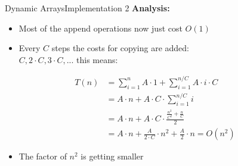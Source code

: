 \begin{frame}{Dynamic Arrays}{Implementation 2}
  \textbf{Analysis:}
  \begin{itemize}
    \item
     Most of the append operations now just cost $O(1)$
    \item
      Every $C$ steps the costs for copying are added:\\
      $C, 2 \cdot C,3 \cdot C, ...$ this means:
  \end{itemize}
  \vspace{-0.1cm}
  \begin{align*}
    T(n) &= \sum_{i=1}^n A \cdot 1 + \sum_{i=1}^{n/C} A \cdot i \cdot C\\
    &= A \cdot n + A \cdot C \cdot \sum_{i=1}^{n/C} i\\
    &= A \cdot n + A \cdot C \cdot \frac{\frac{n^2}{C^2} + \frac{n}{C}}{2}\\
    &= A \cdot n + \frac{A}{2 \cdot C} \cdot n^{2} + \frac{A}{2} \cdot n = O(n^2)
  \end{align*}  
  \vspace{-0.3cm}
   \begin{itemize}
      \item
      The factor of $n^2$ is getting smaller
   \end{itemize}
\end{frame}

